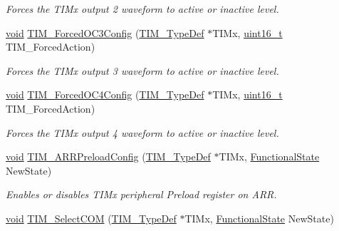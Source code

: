 \begin{DoxyCompactItemize}
\begin{DoxyCompactList}\small\item\em Forces the T\+I\+Mx output 2 waveform to active or inactive level. \end{DoxyCompactList}\item 
\hyperlink{usb__devapi_8h_afabf60e7f57651d6d595a02c75f07cd0}{void} \hyperlink{group___t_i_m___private___functions_ga920b0fb4ca44fceffd1c3e441feebd8f}{T\+I\+M\+\_\+\+Forced\+O\+C3\+Config} (\hyperlink{struct_t_i_m___type_def}{T\+I\+M\+\_\+\+Type\+Def} $\ast$T\+I\+Mx, \hyperlink{_p_e___types_8h_a1f1825b69244eb3ad2c7165ddc99c956}{uint16\+\_\+t} T\+I\+M\+\_\+\+Forced\+Action)
\begin{DoxyCompactList}\small\item\em Forces the T\+I\+Mx output 3 waveform to active or inactive level. \end{DoxyCompactList}\item 
\hyperlink{usb__devapi_8h_afabf60e7f57651d6d595a02c75f07cd0}{void} \hyperlink{group___t_i_m___private___functions_gaf0a0bbe74251e56d4b835d20b0a3aa63}{T\+I\+M\+\_\+\+Forced\+O\+C4\+Config} (\hyperlink{struct_t_i_m___type_def}{T\+I\+M\+\_\+\+Type\+Def} $\ast$T\+I\+Mx, \hyperlink{_p_e___types_8h_a1f1825b69244eb3ad2c7165ddc99c956}{uint16\+\_\+t} T\+I\+M\+\_\+\+Forced\+Action)
\begin{DoxyCompactList}\small\item\em Forces the T\+I\+Mx output 4 waveform to active or inactive level. \end{DoxyCompactList}\item 
\hyperlink{usb__devapi_8h_afabf60e7f57651d6d595a02c75f07cd0}{void} \hyperlink{group___t_i_m___private___functions_ga42b44b9fc2b0798d733720dd6bac1ac0}{T\+I\+M\+\_\+\+A\+R\+R\+Preload\+Config} (\hyperlink{struct_t_i_m___type_def}{T\+I\+M\+\_\+\+Type\+Def} $\ast$T\+I\+Mx, \hyperlink{agilefox_2library_2inc_2stm32f10x__type_8h_ac9a7e9a35d2513ec15c3b537aaa4fba1}{Functional\+State} New\+State)
\begin{DoxyCompactList}\small\item\em Enables or disables T\+I\+Mx peripheral Preload register on A\+RR. \end{DoxyCompactList}\item 
\hyperlink{usb__devapi_8h_afabf60e7f57651d6d595a02c75f07cd0}{void} \hyperlink{group___t_i_m___private___functions_gaff2e7f9959b1b36e830df028c14accc8}{T\+I\+M\+\_\+\+Select\+C\+OM} (\hyperlink{struct_t_i_m___type_def}{T\+I\+M\+\_\+\+Type\+Def} $\ast$T\+I\+Mx, \hyperlink{agilefox_2library_2inc_2stm32f10x__type_8h_ac9a7e9a35d2513ec15c3b537aaa4fba1}{Functional\+State} New\+State)

\end{DoxyCompactItemize}
